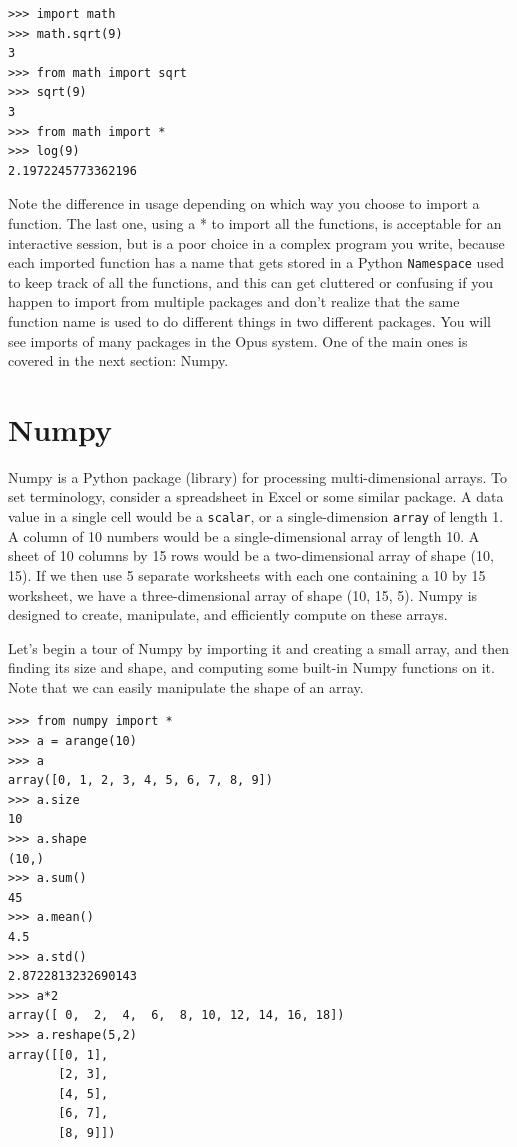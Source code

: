 \begin{lstlisting}
>>> import math
>>> math.sqrt(9)
3
>>> from math import sqrt
>>> sqrt(9)
3
>>> from math import *
>>> log(9)
2.1972245773362196
\end{lstlisting}

Note the difference in usage depending on which way you choose to import a function.  The last one, using a * to import all the functions, is acceptable for an interactive session, but is a poor choice in a complex program you write, because each imported function has a name that gets stored in a Python \verb#Namespace# used to keep track of all the functions, and this can get cluttered or confusing if you happen to import from multiple packages and don't realize that the same function name is used to do different things in two different packages. You will see imports of many packages in the Opus system.  One of the main ones is covered in the next section: Numpy.


\section{Numpy}
\label{sec:numpy}

Numpy is a Python package (library) for processing multi-dimensional arrays.  To set terminology, consider a spreadsheet in Excel or some similar package.  A data value in a single cell would be a \verb#scalar#, or a single-dimension \verb#array# of length 1.  A column of 10 numbers would be a single-dimensional array of length 10.  A sheet of 10 columns by 15 rows would be a two-dimensional array of shape (10, 15).  If we then use 5 separate worksheets with each one containing a 10 by 15 worksheet, we have a three-dimensional array of shape (10, 15, 5).  Numpy is designed to create, manipulate, and efficiently compute on these arrays.

Let's begin a tour of Numpy by importing it and creating a small array,  and then finding its size and shape, and computing some built-in Numpy functions on it. Note that we can easily manipulate the shape of an array.

\begin{lstlisting}
>>> from numpy import *
>>> a = arange(10)
>>> a
array([0, 1, 2, 3, 4, 5, 6, 7, 8, 9])
>>> a.size
10
>>> a.shape
(10,)
>>> a.sum()
45
>>> a.mean()
4.5
>>> a.std()
2.8722813232690143
>>> a*2
array([ 0,  2,  4,  6,  8, 10, 12, 14, 16, 18])
>>> a.reshape(5,2)
array([[0, 1],
       [2, 3],
       [4, 5],
       [6, 7],
       [8, 9]])
\end{lstlisting}

